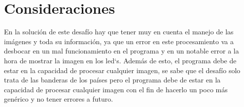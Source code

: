 \documentclass{article}
\begin{document}
\section{Consideraciones}\label{intro}
En la solución de este desafío hay que tener muy en cuenta el manejo de las imágenes y toda su información, ya que un error en este procesamiento va a desbocar en un mal funcionamiento en el programa y en un notable error a la hora de mostrar la imagen en los led`s. Además de esto, el programa debe de estar en la capacidad de procesar cualquier imagen, se sabe que el desafío solo trata de las banderas de los países pero el programa debe de estar en la capacidad de procesar cualquier imagen con el fin de hacerlo un poco más genérico y no tener errores a futuro.
\end{document}
